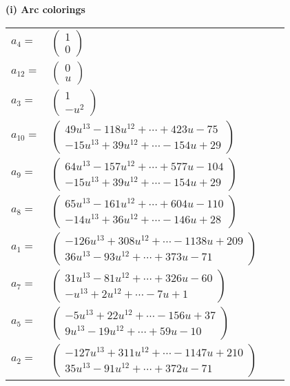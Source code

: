 \documentclass[1p]{elsarticle_modified}
\theoremstyle{definition}
\begin{document}
\flushleft \textbf{(i) Arc colorings}\\
\begin{tabular}{m{7pt} m{180pt} m{7pt} m{180pt} }
\flushright $a_{4}=$&$\begin{pmatrix}1\\0\end{pmatrix}$ \\
\flushright $a_{12}=$&$\begin{pmatrix}0\\u\end{pmatrix}$ \\
\flushright $a_{3}=$&$\begin{pmatrix}1\\- u^2\end{pmatrix}$ \\
\flushright $a_{10}=$&$\begin{pmatrix}49 u^{13}-118 u^{12}+\cdots+423 u-75\\-15 u^{13}+39 u^{12}+\cdots-154 u+29\end{pmatrix}$ \\
\flushright $a_{9}=$&$\begin{pmatrix}64 u^{13}-157 u^{12}+\cdots+577 u-104\\-15 u^{13}+39 u^{12}+\cdots-154 u+29\end{pmatrix}$ \\
\flushright $a_{8}=$&$\begin{pmatrix}65 u^{13}-161 u^{12}+\cdots+604 u-110\\-14 u^{13}+36 u^{12}+\cdots-146 u+28\end{pmatrix}$ \\
\flushright $a_{1}=$&$\begin{pmatrix}-126 u^{13}+308 u^{12}+\cdots-1138 u+209\\36 u^{13}-93 u^{12}+\cdots+373 u-71\end{pmatrix}$ \\
\flushright $a_{7}=$&$\begin{pmatrix}31 u^{13}-81 u^{12}+\cdots+326 u-60\\- u^{13}+2 u^{12}+\cdots-7 u+1\end{pmatrix}$ \\
\flushright $a_{5}=$&$\begin{pmatrix}-5 u^{13}+22 u^{12}+\cdots-156 u+37\\9 u^{13}-19 u^{12}+\cdots+59 u-10\end{pmatrix}$ \\
\flushright $a_{2}=$&$\begin{pmatrix}-127 u^{13}+311 u^{12}+\cdots-1147 u+210\\35 u^{13}-91 u^{12}+\cdots+372 u-71\end{pmatrix}$ \\

\end{tabular}
\end{document}
